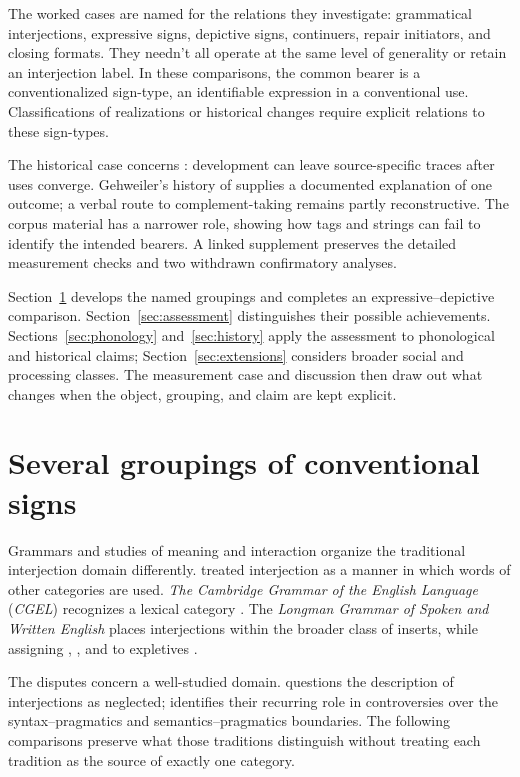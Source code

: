 \documentclass[12pt]{article}
\begin{document}
The worked cases are named for the relations they investigate: grammatical
interjections, expressive signs, depictive signs, continuers, repair
initiators, and closing formats. They needn't all operate at the same level
of generality or retain an interjection label. In these comparisons, the
common bearer is a conventionalized sign-type, an identifiable expression
in a conventional use. Classifications of realizations or historical
changes require explicit relations to these sign-types.

The historical case concerns : development can leave
source-specific traces after uses converge. Gehweiler's history of
 supplies a documented explanation of one outcome; a verbal
route to complement-taking  remains partly reconstructive.
The corpus material has a narrower role, showing how tags and strings
can fail to identify the intended bearers. A linked supplement preserves
the detailed measurement checks and two withdrawn confirmatory analyses.

Section~\ref{sec:worked} develops the named groupings and completes an
expressive--depictive comparison. Section~\ref{sec:assessment} distinguishes
their possible achievements. Sections~\ref{sec:phonology} and~\ref{sec:history}
apply the assessment to phonological and historical claims;
Section~\ref{sec:extensions} considers broader social and processing
classes. The measurement case and discussion then draw out what changes
when the object, grouping, and claim are kept explicit.

\section{Several groupings of conventional signs}\label{sec:worked}

Grammars and studies of meaning and interaction organize the traditional
interjection domain differently. \textcite[90]{jespersen1924} treated
interjection as a manner in which words of other categories are used.
\textit{The Cambridge Grammar of the English Language} (\textit{CGEL})
recognizes a lexical category \citep[22]{HuddlestonPullum2002}. The
\textit{Longman Grammar of Spoken and Written English} places interjections
within the broader class of inserts, while assigning ,
, and  to expletives
\citep[1082--1083, 1094--1095]{Biber1999}.

The disputes concern a well-studied domain. \textcite{libert2019} questions
the description of interjections as neglected; \textcite[63]{cram2008}
identifies their recurring role in controversies over the syntax--pragmatics
and semantics--pragmatics boundaries. The following comparisons preserve
what those traditions distinguish without treating each tradition as the
source of exactly one category.
\end{document}
